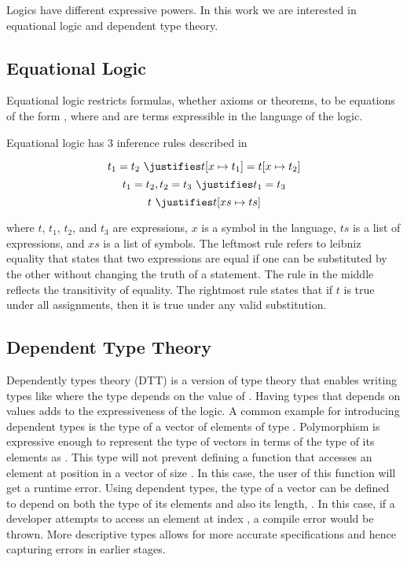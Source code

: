 Logics have different expressive powers. In this work we are interested in equational logic and dependent type theory. 
\subsection{Equational Logic}
Equational logic restricts formulas, whether axioms or theorems, to be equations of the form , where  and   are terms expressible in the language of the logic. 

Equational logic has $3$ inference rules described in~\cite{Gries1993EquationalLogic} 
\begin{proofrules}
        \[ t_1 = t_2 \ \justifies t[x \mapsto t_1] = t[x \mapsto t_2] \]
        \[ t_1 = t_2 , t_2 = t_3 \ \justifies t_1 = t_3 \]
        \[t \ \justifies t [xs \mapsto ts] \] 
\end{proofrules}       
where $t$, $t_1$, $t_2$, and $t_3$ are expressions, $x$ is a symbol in the language, $ts$ is a list of expressions, and $xs$ is a list of symbols. 
The leftmost rule refers to leibniz equality that states that two expressions are equal if one can be substituted by the other without changing the truth of a statement. 
The rule in the middle reflects the transitivity of equality. 
The rightmost rule states that if $t$ is true under all assignments, then it is true under any valid substitution.  

\subsection{Dependent Type Theory}
\label{subsec:background:dtt}
Dependently types theory (DTT) is a version of type theory that enables writing types like  where the type  depends on the value of . 
Having types that depends on values adds to the expressiveness of the logic. A common example for introducing dependent types is the type of a vector of  elements of type . Polymorphism is expressive enough to represent the type of vectors in terms of the type of its elements as . This type will not prevent defining a function that accesses an element at position  in a vector of size . In this case, the user of this function will get a runtime error. Using dependent types, the type of a vector can be defined to depend on both the type of its elements and also its length, . In this case, if a developer attempts to access an element at index , a compile error would be thrown. More descriptive types allows for more accurate specifications and hence capturing errors in earlier stages. 

